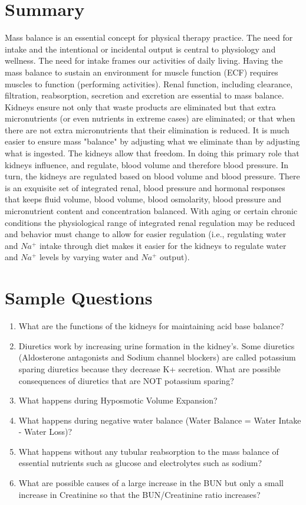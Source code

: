 \section{Summary}
Mass balance is an essential concept for physical therapy practice. The need for intake and the intentional or incidental output is central to physiology and wellness. The need for intake frames our activities of daily living. Having the mass balance to sustain an environment for muscle function (ECF) requires muscles to function (performing activities). Renal function, including clearance, filtration, reabsorption, secretion and excretion are essential to mass balance. Kidneys ensure not only that waste products are eliminated but that extra micronutrients (or even nutrients in extreme cases) are eliminated; or that when there are not extra micronutrients that their elimination is reduced. It is much easier to ensure mass "balance" by adjusting what we eliminate than by adjusting what is ingested. The kidneys allow that freedom. In doing this primary role that kidneys influence, and regulate, blood volume and therefore blood pressure. In turn, the kidneys are regulated based on blood volume and blood pressure. There is an exquisite set of integrated renal, blood pressure and hormonal responses that keeps fluid volume, blood volume, blood osmolarity, blood pressure and micronutrient content and concentration balanced. With aging or certain chronic conditions the physiological range of integrated renal regulation may be reduced and behavior must change to allow for easier regulation (i.e., regulating water and $Na^+$ intake through diet makes it easier for the kidneys to regulate water and $Na^+$ levels by varying water and $Na^+$ output).


\printbibliography[heading=subbibintoc]

\section*{Sample Questions}

\begin{enumerate}
    \item What are the functions of the kidneys for maintaining acid base balance?
    \item Diuretics work by increasing urine formation in the kidney's. Some diuretics (Aldosterone antagonists and Sodium channel blockers) are called potassium sparing diuretics because they decrease K+ secretion. What are possible consequences of diuretics that are NOT potassium sparing?
    \item What happens during Hyposmotic Volume Expansion?
    \item What happens during negative water balance (Water Balance = Water Intake - Water Loss)?
    \item What happens without any tubular reabsorption to the mass balance of essential nutrients such as glucose and electrolytes such as sodium?
    \item What are possible causes of a large increase in the BUN but only a small increase in Creatinine so that the BUN/Creatinine ratio increases? 
\end{enumerate} 